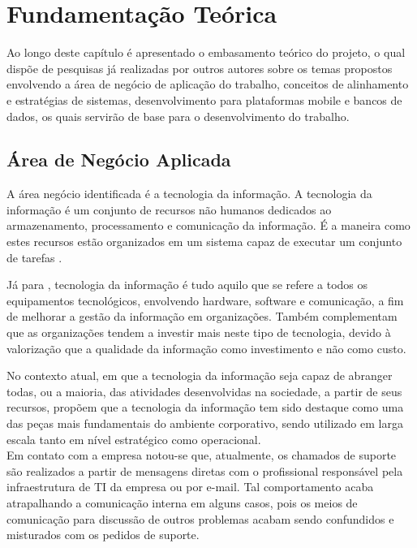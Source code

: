 
\chapter{Fundamentação Teórica}\label{chap:background}
Ao longo deste capítulo é apresentado o embasamento teórico do projeto, o qual dispõe de pesquisas já realizadas por outros autores sobre os temas propostos envolvendo a área de negócio de aplicação do trabalho, conceitos de alinhamento e estratégias de sistemas, desenvolvimento para plataformas mobile e bancos de dados, os quais servirão de base para o desenvolvimento do trabalho. 

\section{Área de Negócio Aplicada}\label{sec:business}
A área negócio identificada é a tecnologia da informação. A tecnologia da informação é um conjunto de recursos não humanos dedicados ao armazenamento, processamento e comunicação da informação. É a maneira como estes recursos estão organizados em um sistema capaz de executar um conjunto de tarefas \citep{pilla_passaia_2010}.

Já para \cite{rezende_abreu_2003}, tecnologia da informação é tudo aquilo que se refere a todos os equipamentos tecnológicos, envolvendo hardware, software e comunicação, a fim de melhorar a gestão da informação em organizações. Também complementam que as organizações tendem a investir mais neste tipo de tecnologia, devido à valorização que a qualidade da informação como investimento e não como custo.
	
No contexto atual, em que a tecnologia da informação seja capaz de abranger todas, ou a maioria, das atividades desenvolvidas na sociedade, a partir de seus recursos, \cite{ti_albertin_moura} propõem que a tecnologia da informação tem sido destaque como uma das peças mais fundamentais do ambiente corporativo, sendo utilizado em larga escala tanto em nível estratégico como operacional. \\

Em contato com a empresa notou-se que, atualmente, os chamados de suporte são realizados a partir de mensagens diretas com o profissional responsável pela infraestrutura de TI da empresa ou por e-mail. Tal comportamento acaba atrapalhando a comunicação interna em alguns casos, pois os meios de comunicação para discussão de outros problemas acabam sendo confundidos e misturados com os pedidos de suporte.

